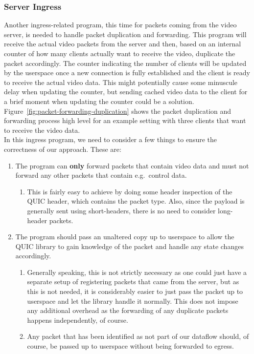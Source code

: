 \subsubsection{Server Ingress}
Another ingress-related program, this time for packets coming from the video server, is needed
to handle packet duplication and forwarding.
This program will receive the actual video packets from the server and then, based on an internal 
counter of how many clients actually want to receive the video, duplicate the packet accordingly.
The counter indicating the number of clients will be updated by the userspace once a new connection 
is fully established and the client is ready to receive the actual video data.
This might potentially cause some minuscule delay when updating the counter, but sending cached 
video data to the client for a brief moment when updating the counter could be a solution. %
Figure~\ref{fig:packet-forwarding-duplication} shows the packet duplication and forwarding process 
high level for an example setting with three clients that want to receive the video data.
\\
In this ingress program, we need to consider a few things to ensure the correctness
of our approach.
These are:
\begin{enumerate}
    \item   The program can \textbf{only} forward packets that contain video data and must not 
            forward any other packets that contain e.g.~control data.
    \begin{enumerate}
        \item   This is fairly easy to achieve by doing some header inspection of the QUIC header,
                which contains the packet type. Also, since the payload is generally sent using 
                short-headers, there is no need to consider long-header packets.
    \end{enumerate}

    \item   The program should pass an unaltered copy up to userspace to allow the QUIC library to
            gain knowledge of the packet and handle any state changes accordingly.
    \begin{enumerate}
        \item   Generally speaking, this is not strictly necessary as one could just have a separate 
                setup of registering packets that came from the server, but as this is not needed,
                it is considerably easier to just pass the packet up to userspace and let the 
                library handle it normally. This does not impose any additional overhead as the
                forwarding of any duplicate packets happens independently, of course.
        \item   Any packet that has been identified as not part of our dataflow should, of course, 
                be passed up to userspace without being forwarded to egress.
    \end{enumerate}
\end{enumerate}

